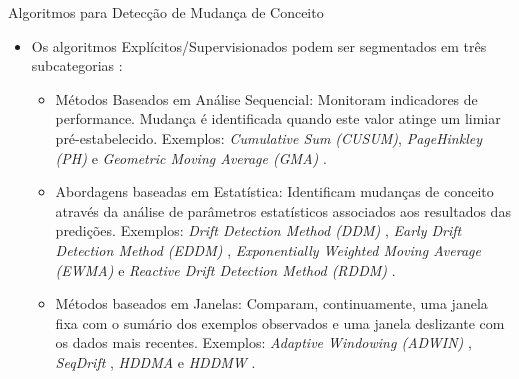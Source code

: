 \documentclass[10pt]{beamer}
\begin{document}
\begin{frame}{Algoritmos para Detecção de Mudança de Conceito}
    \begin{itemize}
        \item<1 -> Os algoritmos \alert{Explícitos/Supervisionados} podem ser segmentados em três subcategorias \cite{Gama:2014:SCD:2597757.2523813}:
        \begin{itemize}
        \item<2 -> \alert{Métodos Baseados em Análise Sequencial}: Monitoram indicadores de performance. Mudança é identificada quando este valor atinge um limiar pré-estabelecido. Exemplos: \textit{Cumulative Sum (CUSUM)}, \textit{PageHinkley (PH)} \cite{Page:CUSUM:PageHinkley:1954} e \textit{Geometric Moving Average (GMA)} \cite{Roberts:2000:CCT:338441.338464}.
        \item<3 -> \alert{Abordagens baseadas em Estatística}: Identificam mudanças de conceito através da análise de parâmetros estatísticos associados aos resultados das predições. Exemplos: \textit{Drift Detection Method (DDM)} \cite{GamaMCR04}, \textit{Early Drift Detection Method (EDDM)} \cite{EDDM}, \textit{Exponentially Weighted Moving Average (EWMA)} \cite{Ross:2012:EWM:2076039.2076307} e \textit{Reactive Drift Detection Method (RDDM)} \cite{Barros:RDDM:2017}.
        \item<4 -> \alert{Métodos baseados em Janelas}: Comparam, continuamente, uma janela fixa com o sumário dos exemplos observados e uma janela deslizante com os dados mais recentes. Exemplos: \textit{Adaptive Windowing (ADWIN)} \cite{BifetG07}, \textit{SeqDrift} \cite{PearsSK14:SeqDrift:2014}, \textit{HDDMA} e \textit{HDDMW} \cite{BlancoCRBDM15:HDDMA:HDDMW:2015}.
        \end{itemize}
    \end{itemize}
\end{frame}
\end{document}
